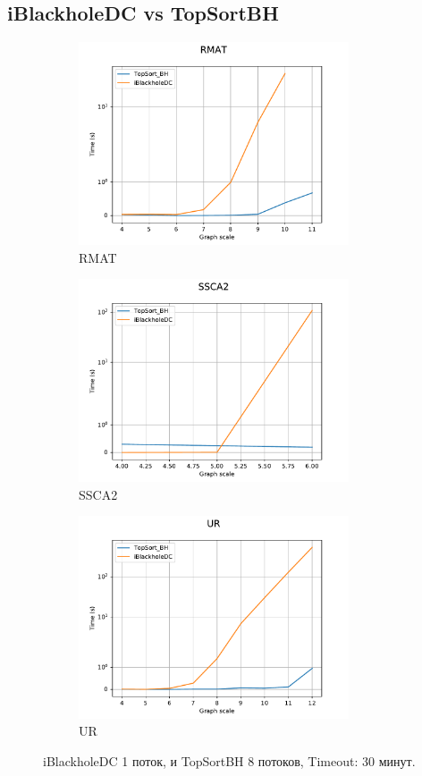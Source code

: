 \documentclass[12pt,a4paper,oneside,openany]{article}
\theoremstyle{definition}
\theoremstyle{lemma}
\theoremstyle{remark}
\begin{document}
\subsection{iBlackholeDC vs TopSortBH}\label{subsec:vanillasucks}

\begin{figure}[H]
    \begin{subfigure}{.5\textwidth}
      \centering
      \includegraphics[width=8cm]{images/1_RMAT.pdf}
      \caption{RMAT}
      \label{fig:vanilla:rmat}
    \end{subfigure}
    \begin{subfigure}{.5\textwidth}
      \centering
      \includegraphics[width=8cm]{images/1_SSCA2.pdf}
      \caption{SSCA2}
      \label{fig:vanilla:ssca}
    \end{subfigure}
    \begin{subfigure}{.5\textwidth}
      \centering
      \includegraphics[width=8cm]{images/1_UR.pdf}
      \caption{UR}
      \label{fig:vanilla:ur}
    \end{subfigure}
    \caption{iBlackholeDC 1 поток, и TopSortBH 8 потоков, Timeout: 30 минут.}
    \label{fig:vanilla}
\end{figure}
\end{document}
